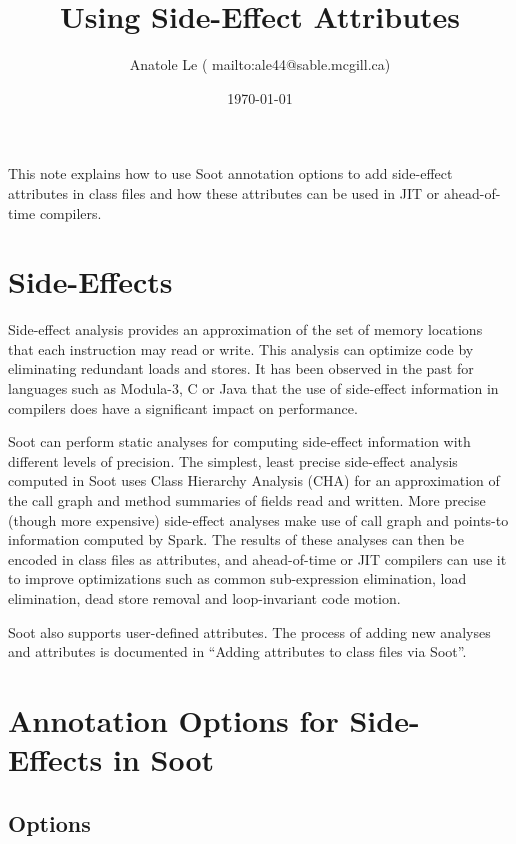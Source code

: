 \documentclass{article}
\begin{document}
\title{Using Side-Effect Attributes}
\author{Anatole Le (
        {mailto:ale44@sable.mcgill.ca})}
\date{\today}
\maketitle

This note explains how to use Soot annotation options to add
side-effect attributes in class files and
how these attributes can be used in JIT or ahead-of-time compilers.

\section{Side-Effects}

Side-effect analysis provides an approximation of the set of memory 
locations that each instruction may read or write. This analysis can 
optimize code by eliminating redundant loads and stores. It has been 
observed in the past for languages such as Modula-3, C or Java that 
the use of side-effect information 
in compilers does have a significant impact on performance.

Soot can perform static analyses for computing side-effect information
with different levels of precision. The simplest, 
least precise side-effect analysis computed in Soot 
uses Class Hierarchy Analysis (CHA) for an approximation of the call 
graph and method summaries of fields read and written. More precise 
(though more expensive) side-effect analyses 
make use of call graph and points-to information computed
by Spark. The results of these analyses can then be encoded in
class files as attributes, and ahead-of-time or JIT compilers can 
use it to improve optimizations such as common sub-expression
elimination, load elimination,
dead store removal and loop-invariant code motion. 

Soot also supports user-defined attributes.
The process of adding new analyses and attributes is documented in
``Adding attributes to class files via Soot''.

\section{Annotation Options for Side-Effects in Soot}

\subsection{Options}
\end{document}
